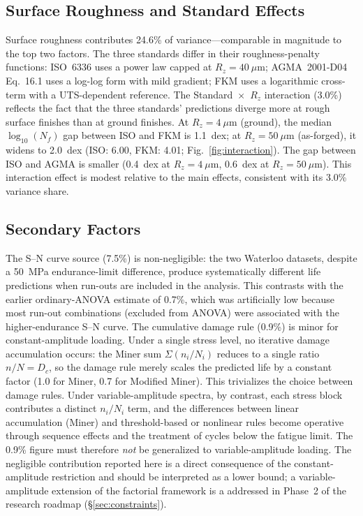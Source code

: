 \documentclass[12pt,a4paper]{article}
\begin{document}
\subsection{Surface Roughness and Standard Effects}

Surface roughness contributes 24.6\% of variance---comparable in magnitude
to the top two factors. The three standards differ in their
roughness-penalty functions: ISO~6336 uses a power law capped at
$R_z=40~\mu$m; AGMA~2001-D04 Eq.~16.1 uses a log-log form with mild
gradient; FKM uses a logarithmic cross-term with a UTS-dependent
reference. The Standard~$\times$~$R_z$ interaction (3.0\%) reflects the
fact that the three standards' predictions diverge more at rough surface
finishes than at ground finishes. At $R_z=4~\mu$m (ground), the median
$\log_{10}(N_f)$ gap between ISO and FKM is 1.1~dex; at
$R_z=50~\mu$m (as-forged), it widens to 2.0~dex (ISO: 6.00, FKM: 4.01;
Fig.~\ref{fig:interaction}). The gap between ISO and AGMA is smaller
(0.4~dex at $R_z=4~\mu$m, 0.6~dex at $R_z=50~\mu$m). This interaction
effect is modest relative to the main effects, consistent with its
3.0\% variance share.

\subsection{Secondary Factors}

The S--N curve source (7.5\%) is non-negligible: the two Waterloo
datasets, despite a 50~MPa endurance-limit difference, produce
systematically different life predictions when run-outs are included
in the analysis. This contrasts with the earlier ordinary-ANOVA
estimate of 0.7\%, which was artificially low because most run-out
combinations (excluded from ANOVA) were associated with the
higher-endurance S--N curve. The cumulative damage rule (0.9\%) is
minor for constant-amplitude loading. Under a single stress level,
no iterative damage accumulation occurs: the Miner sum
$\Sigma(n_i/N_i)$ reduces to a single ratio $n/N = D_c$, so the
damage rule merely scales the predicted life by a constant factor
(1.0 for Miner, 0.7 for Modified Miner). This trivializes the
choice between damage rules. Under variable-amplitude spectra,
by contrast, each stress block contributes a distinct $n_i/N_i$
term, and the differences between linear accumulation (Miner) and
threshold-based or nonlinear rules become operative through sequence
effects and the treatment of cycles below the fatigue limit. The
0.9\% figure must therefore \emph{not} be generalized to
variable-amplitude loading.
The negligible contribution reported here is a direct consequence of
the constant-amplitude restriction and should be interpreted as a
lower bound; a variable-amplitude extension of the factorial
framework is a addressed in Phase~2 of the research roadmap (\S\ref{sec:constraints}).
\end{document}
